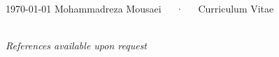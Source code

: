 \documentclass[11pt, a4paper]{awesome-cv}
\begin{document}
\makecvheader

\makecvfooter
  {\today}
  {Mohammadreza Mousaei~~~·~~~Curriculum Vitae}
  {\thepage}






\newpage


















%

\\

\textit{References available upon request}


\end{document}
